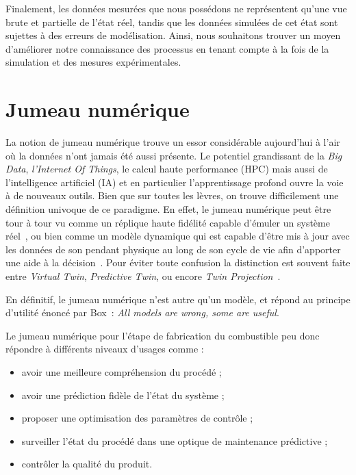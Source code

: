 Finalement, les données mesurées que nous possédons ne représentent qu'une vue brute et partielle de l'état réel, tandis que les données simulées de cet état sont sujettes à des erreurs de modélisation. Ainsi, nous souhaitons trouver un moyen d'améliorer notre connaissance des processus en tenant compte à la fois de la simulation et des mesures expérimentales.

\section{Jumeau numérique}

La notion de jumeau numérique trouve un essor considérable aujourd'hui à l'air où la données n'ont jamais été aussi présente. Le potentiel grandissant de la \textit{Big Data}, \textit{l'Internet Of Things}, le calcul haute performance (HPC) mais aussi de l'intelligence artificiel (IA) et en particulier l'apprentissage profond ouvre la voie à de nouveaux outils. Bien que sur toutes les lèvres, on trouve difficilement une définition univoque de ce paradigme.
En effet, le jumeau numérique peut être tour à tour vu comme un réplique haute fidélité capable d'émuler un système réel~\cite{noauthor_digital_nodate}, ou bien comme un modèle dynamique qui est capable d'être mis à jour avec les données de son pendant physique au long de son cycle de vie afin d'apporter une aide à la décision~\cite{AIAA2020}. Pour éviter toute confusion la distinction est souvent faite entre \textit{Virtual Twin}, \textit{Predictive Twin}, ou encore \textit{Twin Projection}~\cite{Trond Kvamsdal}.

En définitif, le jumeau numérique n'est autre qu'un modèle, et répond au principe d'utilité énoncé par Box~\cite{box1979}: \textit{All models are wrong, some are useful}.

Le jumeau numérique pour l'étape de fabrication du combustible peu donc répondre à différents niveaux d'usages comme :
\begin{itemize}
    \item avoir une meilleure compréhension du procédé ;
    \item avoir une prédiction fidèle de l'état du système ;
    \item proposer une optimisation des paramètres de contrôle ;
    \item surveiller l'état du procédé dans une optique de maintenance prédictive ;
    \item contrôler la qualité du produit.
\end{itemize}

